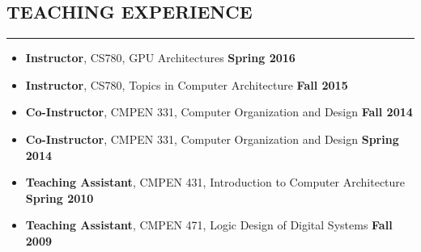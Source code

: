 \documentclass[10pt,a4]{article}
\begin{document}
\subsection*{TEACHING EXPERIENCE}
\hrule
\vspace{0.2cm}

\begin{itemize}
\item{\bf Instructor}, CS780, GPU Architectures \hfill {\bf Spring 2016} 
\item{\bf Instructor}, CS780, Topics in Computer Architecture \hfill {\bf Fall 2015} 
\item{\bf Co-Instructor}, CMPEN 331, Computer Organization and Design \hfill {\bf Fall 2014} 
\item{\bf Co-Instructor}, CMPEN 331, Computer Organization and Design \hfill {\bf Spring 2014} 
\item{\bf Teaching Assistant}, CMPEN 431, Introduction to Computer Architecture  \hfill {\bf Spring 2010} 
\item{\bf Teaching Assistant}, CMPEN 471, Logic Design of Digital Systems  \hfill {\bf Fall 2009} 
\end{itemize}
\end{document}
